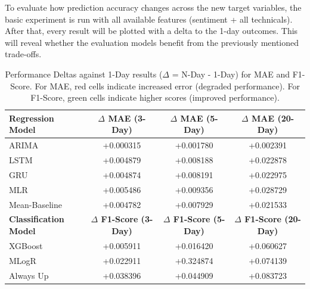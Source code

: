 \documentclass[Master,english,IEEE]{twbook}
\begin{document}
To evaluate how prediction accuracy changes across the new target variables, the basic experiment is run with all available features (sentiment + all technicals). After that, every result will be plotted with a delta to the 1-day outcomes. This will reveal whether the evaluation models benefit from the previously mentioned trade-offs.

\begin{table}[H]
\centering
\small
\setlength{\tabcolsep}{4pt}
\begin{tabular}{|lccc|}
\hline
\textbf{Regression Model} & \textbf{$\Delta$ MAE (3-Day)} & \textbf{$\Delta$ MAE (5-Day)} & \textbf{$\Delta$ MAE (20-Day)} \\
\hline
ARIMA          & \cellcolor{red!25}+0.000315  & \cellcolor{red!25}+0.001780  & \cellcolor{red!25}+0.002391 \\
LSTM           & \cellcolor{red!25}+0.004879  & \cellcolor{red!25}+0.008188  & \cellcolor{red!25}+0.022878 \\
GRU            & \cellcolor{red!25}+0.004874  & \cellcolor{red!25}+0.008191  & \cellcolor{red!25}+0.022975 \\
MLR            & \cellcolor{red!25}+0.005486  & \cellcolor{red!25}+0.009356  & \cellcolor{red!25}+0.028729 \\
Mean-Baseline  & \cellcolor{red!25}+0.004782  & \cellcolor{red!25}+0.007929  & \cellcolor{red!25}+0.021533 \\
\hline
\textbf{Classification Model} & \textbf{$\Delta$ F1-Score (3-Day)} & \textbf{$\Delta$ F1-Score (5-Day)} & \textbf{$\Delta$ F1-Score (20-Day)} \\
\hline
XGBoost        & \cellcolor{green!25}+0.005911  & \cellcolor{green!25}+0.016420  & \cellcolor{green!25}+0.060627 \\
MLogR          & \cellcolor{green!25}+0.022911  & \cellcolor{green!25}+0.324874  & \cellcolor{green!25}+0.074139 \\
Always Up      & \cellcolor{green!25}+0.038396  & \cellcolor{green!25}+0.044909  & \cellcolor{green!25}+0.083723 \\
\hline
\end{tabular}
\caption{Performance Deltas against 1-Day results ($\Delta$ = N-Day - 1-Day) for MAE and F1-Score. For MAE, red cells indicate increased error (degraded performance). For F1-Score, green cells indicate higher scores (improved performance).}
\label{tab:delta_all_horizons_mae_f1}
\end{table}
\end{document}
